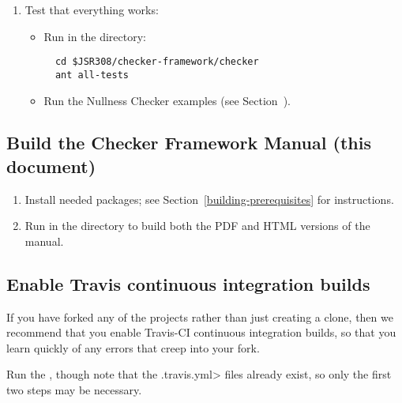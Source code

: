 \begin{enumerate}
\item Test that everything works:

  \begin{itemize}

  \item Run  in the  directory:
\begin{Verbatim}
  cd $JSR308/checker-framework/checker
  ant all-tests
\end{Verbatim}

  \item Run the Nullness Checker examples (see
    Section~).

  \end{itemize}

\end{enumerate}


\subsection{Build the Checker Framework Manual (this document)\label{building-manual}}

\begin{enumerate}
\item
Install needed packages; see Section~\ref{building-prerequisites} for
instructions.

\item
Run  in the  directory to build both the PDF and HTML versions of the manual.
\end{enumerate}


\subsection{Enable Travis continuous integration builds\label{building-travis}}

If you have forked any of the projects rather than just creating a clone,
then we recommend that you enable Travis-CI continuous integration builds,
so that you learn quickly of any errors that creep into your fork.

Run the
,
though note that the \<.travis.yml> files already exist, so only the first
two steps may be necessary.

